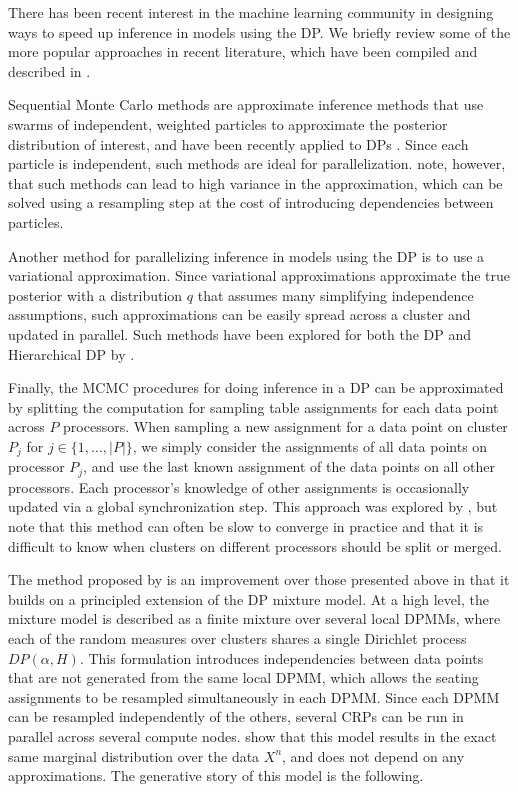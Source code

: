 There has been recent interest in the machine learning community in
designing ways to speed up inference in models using the DP. We
briefly review some of the more popular approaches in recent
literature, which have been compiled and described in
\cite{williamson2013}.

Sequential Monte Carlo methods are approximate inference methods that
use swarms of independent, weighted particles to approximate the
posterior distribution of interest, and have been recently applied to
DPs \cite{fearnhead2004, ulker2010, rodriguez2011, ahmed2011}. Since
each particle is independent, such methods are ideal for
parallelization. \cite{williamson2013} note, however, that such
methods can lead to high variance in the approximation, which can be
solved using a resampling step at the cost of introducing dependencies
between particles.

Another method for parallelizing inference in models using the DP is
to use a variational approximation. Since variational approximations
approximate the true posterior with a distribution $q$ that assumes
many simplifying independence assumptions, such approximations can be
easily spread across a cluster and updated in parallel. Such methods
have been explored for both the DP and Hierarchical DP by
\cite{blei2004, kurihara2007, teh2008, wang2011}.

Finally, the MCMC procedures for doing inference in a DP can be
approximated by splitting the computation for sampling table
assignments for each data point across $P$ processors. When sampling a
new assignment for a data point on cluster $P_j$ for $j \in \{1,
\ldots, |P|\}$, we simply consider the assignments of all data points
on processor $P_j$, and use the last known assignment of the data
points on all other processors. Each processor's knowledge of other
assignments is occasionally updated via a global synchronization
step. This approach was explored by \cite{asuncion2008}, but
\cite{williamson2013} note that this method can often be slow to
converge in practice and that it is difficult to know when clusters on
different processors should be split or merged.

The method proposed by \cite{williamson2013} is an improvement over
those presented above in that it builds on a principled extension of
the DP mixture model. At a high level, the mixture model is described
as a finite mixture over several local DPMMs, where each of the random
measures over clusters shares a single Dirichlet process $DP(\alpha,
H)$. This formulation introduces independencies between data points
that are not generated from the same local DPMM, which allows the
seating assignments to be resampled simultaneously in each DPMM. Since
each DPMM can be resampled independently of the others, several CRPs
can be run in parallel across several compute
nodes. \cite{williamson2013} show that this model results in the exact
same marginal distribution over the data $X^n$, and does not depend on
any approximations. The generative story of this model is the
following.

